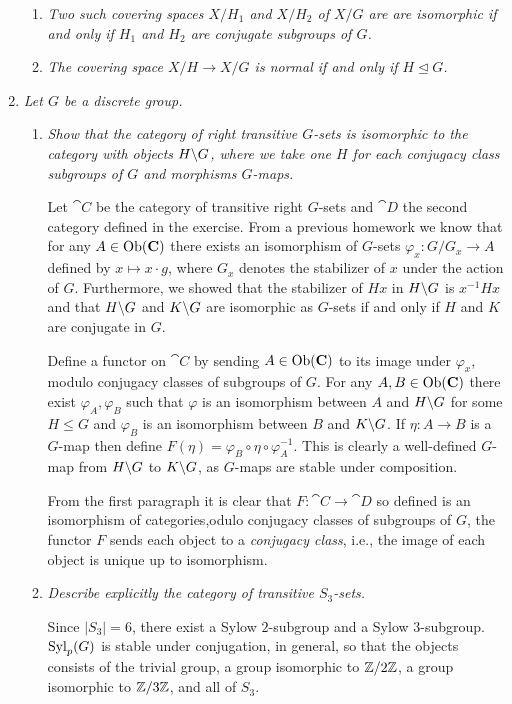 \documentclass[10pt]{article}
\begin{document}
\begin{enumerate}
\begin{enumerate}
\item \emph{Two such covering spaces $X/H_1$ and $X/H_2$ of $X/G$ are are isomorphic if and only if $H_1$ and $H_2$ are conjugate subgroups of $G$.}
\item \emph{The covering space $X/H \rightarrow X/G$ is normal if and only if $H \unlhd G$.}
\end{enumerate}

\item \emph{Let $G$ be a discrete group.}
\begin{enumerate}
\item \emph{Show that the category of right transitive $G$-sets is isomorphic to the category with objects $H \backslash G$, where we take one $H$ for each conjugacy class subgroups of $G$ and morphisms $G$-maps.}

Let $\cat{C}$ be the category of transitive right $G$-sets and $\cat{D}$ the second category defined in the exercise.  From a previous homework we know that for any $A \in \operatorname{Ob}(\mathbf{C})$ there exists an isomorphism of $G$-sets $\varphi_x : G/G_x \rightarrow A$ defined by $x \mapsto x \cdot g$, where $G_x$ denotes the stabilizer of $x$ under the action of $G$.  Furthermore, we showed that the stabilizer of $Hx$ in $H \backslash G$ is $x^{-1} H x$ and that $H \backslash G$ and $K \backslash G$ are isomorphic as $G$-sets if and only if $H$ and $K$ are conjugate in $G$.

Define a functor on $\cat{C}$ by sending $A \in \operatorname{Ob}(\mathbf{C})$ to its image under $\varphi_x$, modulo conjugacy classes of subgroups of $G$.  For any $A,B \in \operatorname{Ob}(\mathbf{C})$ there exist $\varphi_A, \varphi_B$ such that $\varphi$ is an isomorphism between $A$ and $H \backslash G$ for some $H \leq G$ and $\varphi_B$ is an isomorphism between $B$ and $K \backslash G$.  If $\eta: A \rightarrow B$ is a $G$-map then define $F(\eta) = \varphi_B \circ \eta \circ \varphi_A^{-1}$.  This is clearly a well-defined $G$-map from $H \backslash G$ to $K \backslash G$, as $G$-maps are stable under composition.

From the first paragraph it is clear that $F: \cat{C} \rightarrow \cat{D}$ so defined is an isomorphism of categories,odulo conjugacy classes of subgroups of $G$, the functor $F$ sends each object to a \emph{conjugacy class}, i.e., the image of each object is unique up to isomorphism.

\item \emph{Describe explicitly the category of transitive $S_3$-sets.}

Since $|S_3| = 6$, there exist a Sylow $2$-subgroup and a Sylow $3$-subgroup.  $\operatorname{Syl}_p(G)$ is stable under conjugation, in general, so that the objects consists of the trivial group, a group isomorphic to $\mathbb{Z}/2\mathbb{Z}$, a group isomorphic to $\mathbb{Z}/3\mathbb{Z}$, and all of $S_3$.


\end{enumerate}
\end{enumerate}
\end{document}
